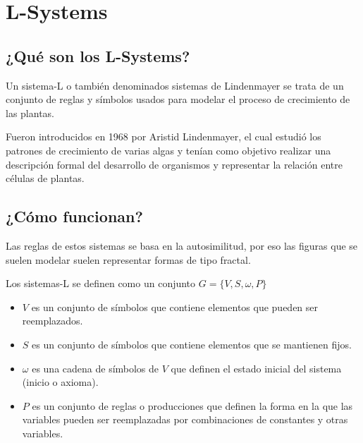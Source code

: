 \chapter{L-Systems}

\section{¿Qué son los L-Systems?}

\noindent Un sistema-L o también denominados sistemas de Lindenmayer se trata de un conjunto de reglas y símbolos usados para modelar el proceso de crecimiento de las plantas.

\noindent Fueron introducidos en 1968 por Aristid Lindenmayer, el cual estudió los patrones de crecimiento de varias algas y tenían como objetivo realizar una descripción formal del desarrollo de organismos y representar la relación entre células de plantas.

\section{¿Cómo funcionan?}

\noindent Las reglas de estos sistemas se basa en la autosimilitud, por eso las figuras que se suelen modelar suelen representar formas de tipo fractal.

\noindent Los sistemas-L se definen como un conjunto $G=\{V,S, \omega ,P\}$

\begin{itemize}
    \item $V$ es un conjunto de símbolos que contiene elementos que pueden ser reemplazados.
    \item $S$ es un conjunto de símbolos que contiene elementos que se mantienen fijos.
    \item $\omega$ es una cadena de símbolos de $V$ que definen el estado inicial del sistema (inicio o axioma).
    \item $P$ es un conjunto de reglas o producciones que definen la forma en la que las variables pueden ser reemplazadas por combinaciones de constantes y otras variables.
\end{itemize}